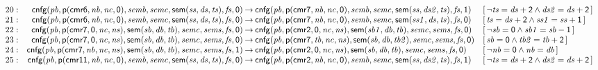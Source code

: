 \documentclass[a4paper]{article}
\newcommand{\symb}[1]{\mathsf{#1}}
\newcommand{\var}[1]{\mathit{#1}}
\newcommand{\Constraint}[1]{[\, #1 \,]}
\begin{document}
\begin{landscape}
\[\begin{array}{rr@{\>}c@{\>}ll}
\mathrm{20} : 
 & \symb{cnfg}(\var{pb},\symb{p}(\symb{cmr6},\var{nb},\var{nc},\symb{0}),\var{semb},\var{semc},\symb{sem}(\var{ss},\var{ds},\var{ts}),\var{fs},\symb{0})
 & \to 
 & \symb{cnfg}(\var{pb},\symb{p}(\symb{cmr7},\var{nb},\var{nc},\symb{0}),\var{semb},\var{semc},\symb{sem}(\var{ss},\var{ds2},\var{ts}),\var{fs},\symb{1})
 & \Constraint{\neg \var{ts} = \var{ds} + \symb{2} \land \var{ds2} = \var{ds} + \symb{2}}\\

\mathrm{21} : 
 & \symb{cnfg}(\var{pb},\symb{p}(\symb{cmr6},\var{nb},\var{nc},\symb{0}),\var{semb},\var{semc},\symb{sem}(\var{ss},\var{ds},\var{ts}),\var{fs},\symb{0})
 & \to 
 & \symb{cnfg}(\var{pb},\symb{p}(\symb{cmr7},\var{nb},\var{nc},\symb{0}),\var{semb},\var{semc},\symb{sem}(\var{ss1},\var{ds},\var{ts}),\var{fs},\symb{0})
 & \Constraint{\var{ts} = \var{ds} + \symb{2} \land \var{ss1} = \var{ss} + \symb{1}}\\

\mathrm{22} : 
 & \symb{cnfg}(\var{pb},\symb{p}(\symb{cmr7},\symb{0},\var{nc},\var{ns}),\symb{sem}(\var{sb},\var{db},\var{tb}),\var{semc},\var{sems},\var{fs},\symb{0})
 & \to 
 & \symb{cnfg}(\var{pb},\symb{p}(\symb{cmr2},\symb{0},\var{nc},\var{ns}),\symb{sem}(\var{sb1},\var{db},\var{tb}),\var{semc},\var{sems},\var{fs},\symb{0})
 & \Constraint{\neg \var{sb} = \symb{0} \land \var{sb1} = \var{sb} - \symb{1}}\\

\mathrm{23} : 
 & \symb{cnfg}(\var{pb},\symb{p}(\symb{cmr7},\symb{0},\var{nc},\var{ns}),\symb{sem}(\var{sb},\var{db},\var{tb}),\var{semc},\var{sems},\var{fs},\symb{0})
 & \to 
 & \symb{cnfg}(\var{pb},\symb{p}(\symb{cmr7},\var{tb},\var{nc},\var{ns}),\symb{sem}(\var{sb},\var{db},\var{tb2}),\var{semc},\var{sems},\var{fs},\symb{0})
 & \Constraint{\var{sb} = \symb{0} \land \var{tb2} = \var{tb} + \symb{2}}\\

\mathrm{24} : 
 & \symb{cnfg}(\var{pb},\symb{p}(\symb{cmr7},\var{nb},\var{nc},\var{ns}),\symb{sem}(\var{sb},\var{db},\var{tb}),\var{semc},\var{sems},\var{fs},\symb{1})
 & \to 
 & \symb{cnfg}(\var{pb},\symb{p}(\symb{cmr2},\symb{0},\var{nc},\var{ns}),\symb{sem}(\var{sb},\var{db},\var{tb}),\var{semc},\var{sems},\var{fs},\symb{0})
 & \Constraint{\neg \var{nb} = \symb{0} \land \var{nb} = \var{db}}\\

\mathrm{25} : 
 & \symb{cnfg}(\var{pb},\symb{p}(\symb{cmr11},\var{nb},\var{nc},\symb{0}),\var{semb},\var{semc},\symb{sem}(\var{ss},\var{ds},\var{ts}),\var{fs},\symb{0})
 & \to 
 & \symb{cnfg}(\var{pb},\symb{p}(\symb{cmr2},\var{nb},\var{nc},\symb{0}),\var{semb},\var{semc},\symb{sem}(\var{ss},\var{ds2},\var{ts}),\var{fs},\symb{1})
 & \Constraint{\neg \var{ts} = \var{ds} + \symb{2} \land \var{ds2} = \var{ds} + \symb{2}}\\


\end{array}\]
\end{landscape}
\end{document}
